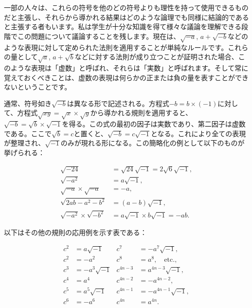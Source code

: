 \documentclass[a4paper,11pt,openany]{ltjsbook}
\begin{document}
一部の人々は、これらの符号を他のどの符号よりも理性を持って使用できるものだと主張し、それらから導かれる結果はどのような論理でも同様に結論的であると主張する者もいます。私は学生が十分な知識を得て様々な議論を理解できる段階でこの問題について議論することを残します。現在は、$\sqrt{-a}$, $a + \sqrt{-b}$などのような表現に対して定められた法則を適用することが単純なルールです。これらの量として$\sqrt{a}$, $a + \sqrt{b}$などに対する法則が成り立つことが証明された場合、このような表現は「虚数」と呼ばれ、それらは「実数」と呼ばれます。そして常に覚えておくべきことは、虚数の表現は何らかの正または負の量を表すことができないということです。

通常、符号如き$\sqrt{-b}$は異なる形で記述される。方程式$-b = b \times (-1)$に対して、方程式$\sqrt{xy} = \sqrt{x} \times \sqrt{y}$から導かれる規則を適用すると、$\sqrt{-b} = \sqrt{b} \times \sqrt{-1}$を得る。この式の最初の因子は実数であり、第二因子は虚数である。ここで$\sqrt{b} = c$と置くと、$\sqrt{-b} = c\sqrt{-1}$となる。これにより全ての表現が整理され、$\sqrt{-1}$のみが現れる形になる。この簡略化の例として以下のものが挙げられる：

\begin{align*}
\sqrt{-24} &= \sqrt{24}\sqrt{-1} = 2\sqrt{6}\sqrt{-1}, \\
\sqrt{-a^{2}} &= a\sqrt{-1}, \\
\sqrt{-a} \times \sqrt{-a} &= -a, \\
\sqrt{2ab - a^{2} - b^{2}} &= (a - b)\sqrt{-1}, \\
\sqrt{-a^{2}} \times \sqrt{-b^{2}} &= a\sqrt{-1} \times b\sqrt{-1} = -ab.
\end{align*}

以下はその他の規則の応用例を示す表である：

\begin{align*}
c^{2} &= a\sqrt{-1} & c^{7} &= -a^{7}\sqrt{-1}, \\
c^{2} &= -a^{2}     & c^{8} &= a^{8}, \quad \text{etc.}, \\
c^{3} &= -a^{3}\sqrt{-1} & c^{4n-3} &= a^{4n-3}\sqrt{-1}, \\
c^{4} &= a^{4}      & c^{4n-2} &= -a^{4n-2}, \\
c^{5} &= a^{5}\sqrt{-1} & c^{4n-1} &= -a^{4n-1}\sqrt{-1}, \\
c^{6} &= -a^{6}     & c^{4n} &= a^{4n}.
\end{align*}
\end{document}
